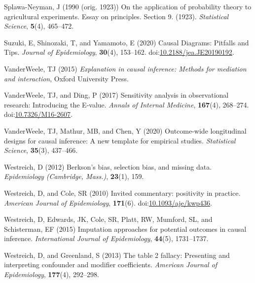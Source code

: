 \documentclass[
  singlecolumn]{article}
\newlength{\cslhangindent}
\newenvironment{CSLReferences}[2] %
 {\begin{list}{}{%
  \setlength{\itemindent}{0pt}
  \setlength{\leftmargin}{0pt}
  \setlength{\parsep}{0pt}
  \ifodd #1
   \setlength{\leftmargin}{\cslhangindent}
   \setlength{\itemindent}{-1\cslhangindent}
  \fi
  \setlength{\itemsep}{#2\baselineskip}}}
 {\end{list}}
\begin{document}
\begin{CSLReferences}{1}{0}
Splawa-Neyman, J (1990 (orig. 1923)) On the application of probability
theory to agricultural experiments. Essay on principles. Section 9.
(1923). \emph{Statistical Science}, \textbf{5}(4), 465--472.

Suzuki, E, Shinozaki, T, and Yamamoto, E (2020) Causal Diagrams:
Pitfalls and Tips. \emph{Journal of Epidemiology}, \textbf{30}(4),
153--162.
doi:\href{https://doi.org/10.2188/jea.JE20190192}{10.2188/jea.JE20190192}.

VanderWeele, TJ (2015) \emph{Explanation in causal inference: Methods
for mediation and interaction}, Oxford University Press.

VanderWeele, TJ, and Ding, P (2017) Sensitivity analysis in
observational research: Introducing the {E}-value. \emph{Annals of
Internal Medicine}, \textbf{167}(4), 268--274.
doi:\href{https://doi.org/10.7326/M16-2607}{10.7326/M16-2607}.

VanderWeele, TJ, Mathur, MB, and Chen, Y (2020) Outcome-wide
longitudinal designs for causal inference: A new template for empirical
studies. \emph{Statistical Science}, \textbf{35}(3), 437--466.

Westreich, D (2012) Berkson's bias, selection bias, and missing data.
\emph{Epidemiology (Cambridge, Mass.)}, \textbf{23}(1), 159.

Westreich, D, and Cole, SR (2010) Invited commentary: positivity in
practice. \emph{American Journal of Epidemiology}, \textbf{171}(6).
doi:\href{https://doi.org/10.1093/aje/kwp436}{10.1093/aje/kwp436}.

Westreich, D, Edwards, JK, Cole, SR, Platt, RW, Mumford, SL, and
Schisterman, EF (2015) Imputation approaches for potential outcomes in
causal inference. \emph{International Journal of Epidemiology},
\textbf{44}(5), 1731--1737.

Westreich, D, and Greenland, S (2013) The table 2 fallacy: Presenting
and interpreting confounder and modifier coefficients. \emph{American
Journal of Epidemiology}, \textbf{177}(4), 292--298.

\end{CSLReferences}
\end{document}
